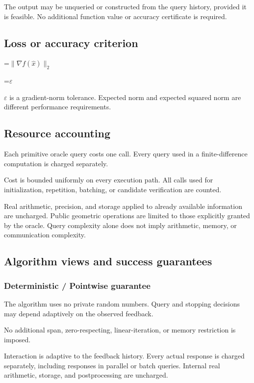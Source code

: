 \documentclass[10pt,a4paper]{article}
\newcommand{\AtlasMath}[1]{\par\begingroup\centering\setbox0=\hbox{$\displaystyle #1$}\ifdim\wd0>1.4\linewidth\typeout{ATLAS WIDE FORMULA: \the\wd0}\fi\ifdim\wd0>\linewidth\resizebox{\linewidth}{!}{\box0}\else\box0\fi\par\endgroup}
\newcommand{\AtlasInlineMath}[1]{\begingroup\setbox0=\hbox{$#1$}\ifdim\wd0>.4\linewidth\endgroup\AtlasMath{#1}\else\endgroup$#1$\fi}
\begin{document}
The output may be unqueried or constructed from the query history, provided it is feasible. No additional function value or accuracy certificate is required.

\subsection{Loss or accuracy criterion}



\AtlasMath{\|\nabla f(\widehat{x})\|_2}




\AtlasInlineMath{\varepsilon} is a gradient-norm tolerance. Expected norm and expected squared norm are different performance requirements.

\subsection{Resource accounting}
Each primitive oracle query costs one call. Every query used in a finite-difference computation is charged separately.

Cost is bounded uniformly on every execution path. All calls used for initialization, repetition, batching, or candidate verification are counted.

Real arithmetic, precision, and storage applied to already available information are uncharged. Public geometric operations are limited to those explicitly granted by the oracle. Query complexity alone does not imply arithmetic, memory, or communication complexity.

\subsection{Algorithm views and success guarantees}
\subsubsection{Deterministic / Pointwise guarantee}
The algorithm uses no private random numbers. Query and stopping decisions may depend adaptively on the observed feedback.

No additional span, zero-respecting, linear-iteration, or memory restriction is imposed.

Interaction is adaptive to the feedback history. Every actual response is charged separately, including responses in parallel or batch queries. Internal real arithmetic, storage, and postprocessing are uncharged.
\end{document}
